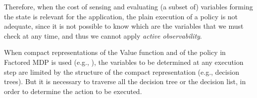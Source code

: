 Therefore, when the cost of sensing and evaluating (a subset of) variables forming the state is relevant for the application, the plain execution of a policy is not adequate, since it is not possible to know which are the variables that we must check at any time, and thus we cannot apply \emph{active observability}.

When compact representations of the Value function and of the policy in Factored MDP is used (e.g., \cite{Hoey99spudd,KoPa00}), the variables to be determined at any execution step are limited by the structure of the compact representation (e.g., decision trees). But it is necessary to traverse all the decision tree or the decision list, in order to determine the action to be executed.





